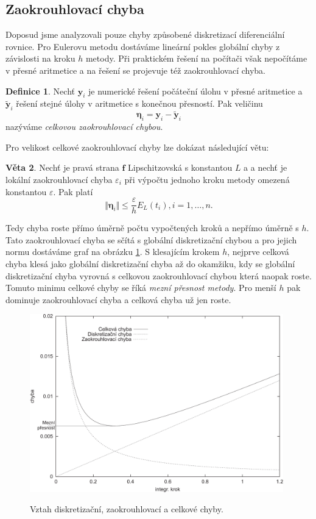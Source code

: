 \documentclass[a4paper, 12pt]{book}
\theoremstyle{definition}
\newtheorem{theorem}{Věta}[section]
\newtheorem{definition}[theorem]{Definice}
\def\vc#1{\mathbf{\boldsymbol{#1}}}     %
\def\norm#1{\bigl\Vert#1\bigr\Vert} %
\def\df#1{\emph{#1}}
\begin{document}
\subsection{Zaokrouhlovací chyba}
Doposud jsme analyzovali pouze chyby způsobené diskretizací diferenciální rovnice. Pro Eulerovu metodu dostáváme lineární pokles globální chyby z závislosti na 
kroku $h$ metody. Při praktickém řešení na počítači však nepočítáme v přesné aritmetice a na řešení se projevuje též zaokrouhlovací chyba.

\begin{definition}
  Nechť $\vc y_i$ je numerické řešení počáteční úlohu v přesné aritmetice a $\vc{\tilde y}_i$ řešení stejné úlohy v aritmetice s konečnou přesností. Pak 
  veličinu 
  \[
     \vc \eta_i = \vc y_i - \vc{\tilde y}_i
  \]
  nazýváme \df{celkovou zaokrouhlovací chybou}.
\end{definition}

Pro velikost celkové zaokrouhlovací chyby lze dokázat následující větu:
\begin{theorem}\label{Veta2.5}
Nechť je pravá strana $\vc f$ Lipschitzovská s konstantou $L$ a
a nechť je lokální zaokrouhlovací chyba $\varepsilon_i$ při výpočtu jednoho kroku metody omezená konstantou $\varepsilon$.
Pak platí
\begin{equation}\label{zaokrchEuler}
\norm{\vc \eta_i}\leq \frac\varepsilon h E_L(t_i), i=1,\dots,n.
\end{equation}
\end{theorem}
Tedy chyba roste přímo úměrně počtu vypočtených kroků a nepřímo úměrně s $h$. Tato zaokrouhlovací chyba se sčítá s globální diskretizační chybou a pro 
jejich normu dostáváme graf na obrázku \ref{fig:limit_precision}. S klesajícím krokem $h$, nejprve celková chyba klesá jako globální diskretizační chyba
až do okamžiku, kdy se globální diskretizační chyba vyrovná s celkovou zaokrouhlovací chybou která naopak roste. Tomuto minimu celkové chyby se říká 
\df{mezní přesnost metody}. Pro menší $h$ pak dominuje zaokrouhlovací chyba a celková chyba už jen roste.


\begin{figure}[ht]
\centering
\includegraphics[width=0.98\textwidth]{chyby}\\
\caption[]{Vztah diskretizační, zaokrouhlovací a celkové chyby.}
\label{fig:limit_precision}
\end{figure}
\end{document}

